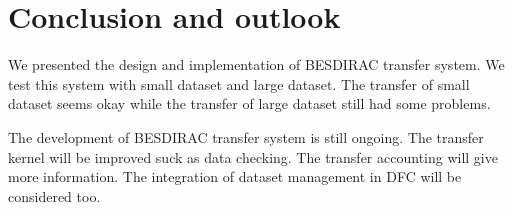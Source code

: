 \section{Conclusion and outlook}
We presented the design and implementation of BESDIRAC transfer system.
We test this system with small dataset and large dataset.
The transfer of small dataset seems okay while the transfer of large
dataset still had some problems.

The development of BESDIRAC transfer system is still ongoing.
The transfer kernel will be improved suck as data checking.
The transfer accounting will give more information.
The integration of dataset management in DFC will be considered too.
